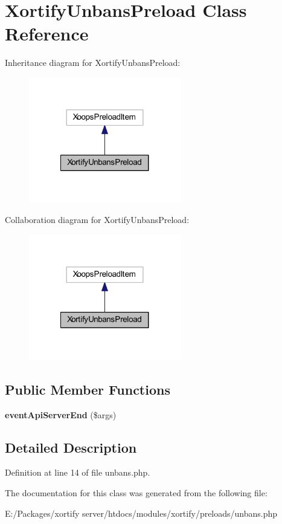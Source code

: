 \hypertarget{class_xortify_unbans_preload}{\section{Xortify\-Unbans\-Preload Class Reference}
\label{class_xortify_unbans_preload}
}


Inheritance diagram for Xortify\-Unbans\-Preload\-:
\nopagebreak
\begin{figure}[H]
\begin{center}
\leavevmode
\includegraphics[width=188pt]{class_xortify_unbans_preload__inherit__graph}
\end{center}
\end{figure}


Collaboration diagram for Xortify\-Unbans\-Preload\-:
\nopagebreak
\begin{figure}[H]
\begin{center}
\leavevmode
\includegraphics[width=188pt]{class_xortify_unbans_preload__coll__graph}
\end{center}
\end{figure}
\subsection*{Public Member Functions}
\begin{DoxyCompactItemize}
\item 
\hypertarget{class_xortify_unbans_preload_a62e459a2f1d1676b74b93eaa0e01bd02}{{\bfseries event\-Api\-Server\-End} (\$args)}\label{class_xortify_unbans_preload_a62e459a2f1d1676b74b93eaa0e01bd02}

\end{DoxyCompactItemize}


\subsection{Detailed Description}


Definition at line 14 of file unbans.\-php.



The documentation for this class was generated from the following file\-:\begin{DoxyCompactItemize}
\item 
E\-:/\-Packages/xortify server/htdocs/modules/xortify/preloads/unbans.\-php\end{DoxyCompactItemize}

